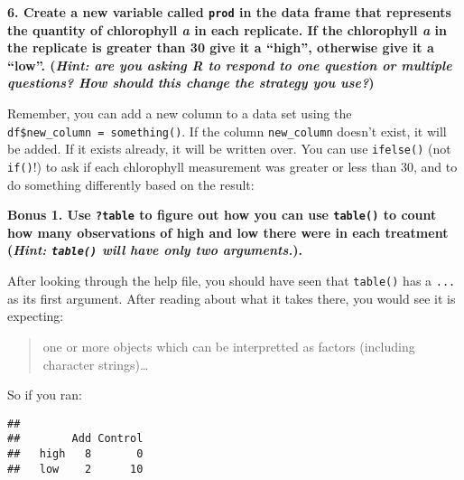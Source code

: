 \documentclass[]{book}
\newenvironment{Shaded}{\begin{snugshade}}{\end{snugshade}}
\newcommand{\KeywordTok}[1]{\textcolor[rgb]{0.13,0.29,0.53}{\textbf{#1}}}
\newcommand{\DecValTok}[1]{\textcolor[rgb]{0.00,0.00,0.81}{#1}}
\newcommand{\StringTok}[1]{\textcolor[rgb]{0.31,0.60,0.02}{#1}}
\newcommand{\OperatorTok}[1]{\textcolor[rgb]{0.81,0.36,0.00}{\textbf{#1}}}
\newcommand{\NormalTok}[1]{#1}
\theoremstyle{definition}
\theoremstyle{definition}
\theoremstyle{definition}
\theoremstyle{remark}
\begin{document}
\textbf{6. Create a new variable called \texttt{prod} in the data frame
that represents the quantity of chlorophyll \emph{a} in each replicate.
If the chlorophyll \emph{a} in the replicate is greater than 30 give it
a ``high'', otherwise give it a ``low''. (\emph{Hint: are you asking R
to respond to one question or multiple questions? How should this change
the strategy you use?})}

Remember, you can add a new column to a data set using the
\texttt{df\$new\_column\ =\ something()}. If the column
\texttt{new\_column} doesn't exist, it will be added. If it exists
already, it will be written over. You can use \texttt{ifelse()} (not
\texttt{if()}!) to ask if each chlorophyll measurement was greater or
less than 30, and to do something differently based on the result:

\begin{Shaded}
\end{Shaded}

\textbf{Bonus 1. Use \texttt{?table} to figure out how you can use
\texttt{table()} to count how many observations of high and low there
were in each treatment (\emph{Hint: \texttt{table()} will have only two
arguments.}).}

After looking through the help file, you should have seen that
\texttt{table()} has a \texttt{...} as its first argument. After reading
about what it takes there, you would see it is expecting:

\begin{quote}
one or more objects which can be interpretted as factors (including
character strings)\ldots{}
\end{quote}

So if you ran:

\begin{Shaded}
\end{Shaded}

\begin{verbatim}
##       
##        Add Control
##   high   8       0
##   low    2      10
\end{verbatim}
\end{document}

